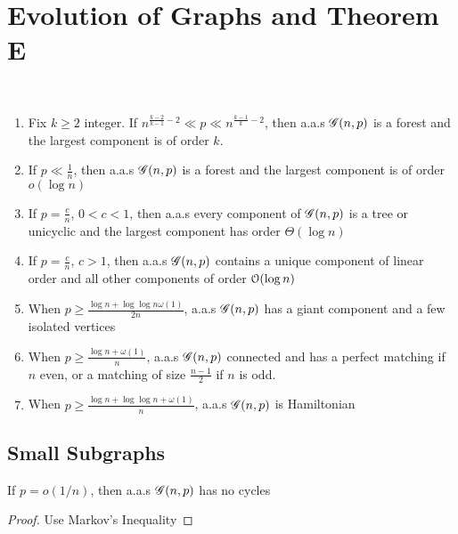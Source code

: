 \section{Evolution of Graphs and Theorem E}

\begin{theorem}[Theorem E]\label{th:E}
    ~
    \begin{enumerate}[label = (\alph*)]
        \item Fix $k \geq 2$ integer.
        If $n^{\frac{k-2}{k-1} - 2} \ll p \ll n^{\frac{k-1}{k} - 2}$, then a.a.s $\operatorname{\mathscr{G}}(n, p)$ is a forest and the largest component is of order $k$.

        \item If $p \ll \frac{1}{n}$, then a.a.s $\operatorname{\mathscr{G}}(n, p)$ is a forest and the largest component is of order $o(\log n)$
        
        \item If $p = \frac{c}{n}$, $0 < c < 1$, then a.a.s every component of $\operatorname{\mathscr{G}}(n, p)$ is a tree or unicyclic and the largest component has order $\Theta(\log n)$
        
        \item If $p = \frac{c}{n}$, $c > 1$, then a.a.s $\operatorname{\mathscr{G}}(n, p)$ contains a unique component of linear order and all other components of order $\operatorname{\mathcal{O}}(\log n)$
        
        \item When $p \geq \frac{\log n + \log\log n \omega(1)}{2n}$, a.a.s $\operatorname{\mathscr{G}}(n, p)$ has a giant component and a few isolated vertices
        
        \item When $p \geq \frac{\log n + \omega(1)}{n}$, a.a.s $\operatorname{\mathscr{G}}(n, p)$ connected and has a perfect matching if $n$ even, or a matching of size $\frac{n-1}{2}$ if $n$ is odd.
        
        \item When $p \geq \frac{\log n + \log\log n + \omega(1)}{n}$, a.a.s $\operatorname{\mathscr{G}}(n, p)$ is Hamiltonian
    \end{enumerate}
\end{theorem}

\subsection{Small Subgraphs}
\begin{lemma}
    If $p = o(1/n)$, then a.a.s $\operatorname{\mathscr{G}}(n, p)$ has no cycles
\end{lemma}
\begin{proof}
    Use Markov's Inequality
\end{proof}

